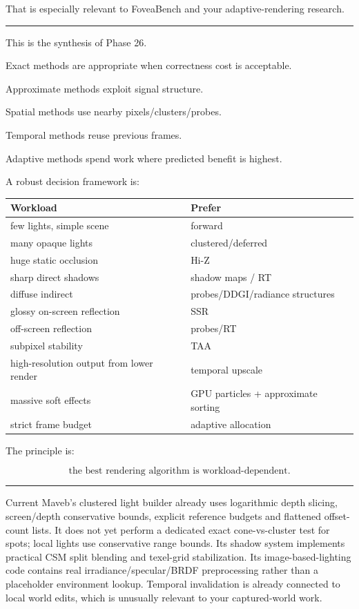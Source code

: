 That is especially relevant to FoveaBench and your adaptive-rendering research.

\begin{center}\rule{0.5\linewidth}{0.5pt}\end{center}

This is the synthesis of Phase 26.

Exact methods are appropriate when correctness cost is acceptable.

Approximate methods exploit signal structure.

Spatial methods use nearby pixels/clusters/probes.

Temporal methods reuse previous frames.

Adaptive methods spend work where predicted benefit is highest.

A robust decision framework is:

{\def\LTcaptype{none} %
\begin{longtable}[]{@{}ll@{}}
\toprule\noalign{}
Workload & Prefer \\
\midrule\noalign{}
\endhead
\bottomrule\noalign{}
\endlastfoot
few lights, simple scene & forward \\
many opaque lights & clustered/deferred \\
huge static occlusion & Hi-Z \\
sharp direct shadows & shadow maps / RT \\
diffuse indirect & probes/DDGI/radiance structures \\
glossy on-screen reflection & SSR \\
off-screen reflection & probes/RT \\
subpixel stability & TAA \\
high-resolution output from lower render & temporal upscale \\
massive soft effects & GPU particles + approximate sorting \\
strict frame budget & adaptive allocation \\
\end{longtable}
}

The principle is:

\[
\boxed{
\text{the best rendering algorithm is workload-dependent}.
}
\]

\begin{center}\rule{0.5\linewidth}{0.5pt}\end{center}

Current Maveb's clustered light builder already uses logarithmic depth slicing, screen/depth conservative bounds, explicit reference budgets and flattened offset-count lists. It does not yet perform a dedicated exact cone-vs-cluster test for spots; local lights use conservative range bounds. Its shadow system implements practical CSM split blending and texel-grid stabilization. Its image-based-lighting code contains real irradiance/specular/BRDF preprocessing rather than a placeholder environment lookup. Temporal invalidation is already connected to local world edits, which is unusually relevant to your captured-world work.

